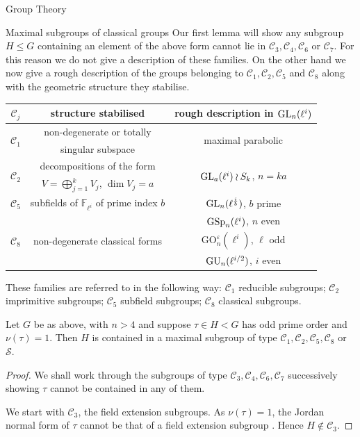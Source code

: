\documentclass[11pt,a4paper]{article}
\newcommand{\Fli}{\mathbb{F}_{\ell^i}}
\newcommand{\C}{\mathcal{C}}
\begin{document}
\begin{section}{Group Theory}
\begin{subsection}{Maximal subgroups of classical groups}
Our first lemma will show any subgroup $H \leq G$ containing an element of the above form cannot lie in $\C_3, \C_4,\C_6$ or $\C_7$. For this reason we do not give a description of these families. On the other hand we now give a rough description of the groups belonging to $\C_1,\C_2,\C_5$ and $\C_8$ along with the geometric structure they stabilise.

\begin{table}[tp]
    \centering
    \begin{tabular}{|c| c |c|}
    \hline
    $\C_j$ & structure stabilised & rough description in $\GL_n(\ell^i)$ \\ [0.5ex] 
        \hline \hline
\multirow{2}{1em}{$\C_1$} & non-degenerate or totally  & \multirow{2}{8.5em}{maximal parabolic} \\
 & singular subspace & \\
\hline
\multirow{2}{1em}{$\C_2$} &  decompositions of the form & \multirow{2}{9.2em}{$\GL_a(\ell^i) \wr S_k$, $n = ka$} \\
& $V = \bigoplus_{j=1}^k V_j$, $\dim V_j =a$ & \\
\hline
$\C_5$ & subfields of $\Fli$ of prime index $b$ & $\GL_n(\ell^{\frac{i}{b}})$, $b$ prime \\
\hline
\multirow{3}{1em}{$\C_8$}  & \multirow{3}{14em}{non-degenerate classical forms} &  $\GSp_n(\ell^i)$, $n$ even \\ 
& & $\mathrm{GO}^\varepsilon_n(\ell^i)$, $\ell$ odd \\ 
& & $\GU_n(\ell^{i/2})$, $i$ even\\
\hline
    \end{tabular}
\end{table}

These families are referred to in the following way: $\C_1$ reducible subgroups; $\C_2$ imprimitive subgroups; $\C_5$ subfield subgroups; $\C_8$ classical subgroups.


\begin{lemma}
\label{Get_rid_Aschbacher_families}
Let $G$ be as above, with $n > 4$ and suppose $\tau \in H < G$ has odd prime order and $\nu(\tau) =1$. Then $H$ is contained in a maximal subgroup of type $\C_1, \C_2, \C_5, \C_8$ or $\mathcal{S}$.
\end{lemma}

\begin{proof}
We shall work through the subgroups of type $\C_3,\C_4,\C_6,\C_7$ successively showing $\tau$ cannot be contained in any of them.

We start with $\C_3$, the field extension subgroups. As $\nu(\tau)=1$, the Jordan normal form of $\tau$ cannot be that of a field extension subgroup \cite[Lemma 4.2]{Liebeck_Shalev}. Hence $H \not \in \C_3$.


\end{proof}
\end{subsection}
\end{section}
\end{document}
